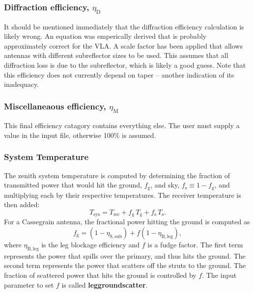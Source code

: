 \documentclass{article}
\begin{document}
\subsubsection{Diffraction efficiency, $\eta_\mathrm{D}$}

It should be mentioned immediately that the diffraction efficiency 
calculation is likely wrong.  An equation was emperically derived that 
is probably approximately correct for the VLA.  A scale factor
has been applied that allows antennas with different subreflector
sizes to be used.  This assumes that all diffraction loss is due to the
subreflector, which is likely a good guess.  Note that this efficiency
does not currently depend on taper -- another indication of its inadequacy.

\subsubsection{Miscellaneaous efficiency, $\eta_\mathrm{M}$}

This final efficiency catagory contains everything else.  The user must supply
a value in the input file, otherwise 100\% is assumed.

\subsubsection{System Temperature}

The zenith system temperature is computed by determining the fraction of
transmitted power that would hit the ground, $f_\mathrm{g}$, and sky,
$f_\mathrm{s} \equiv 1-f_\mathrm{g}$, and multiplying each by their
respective temperatures.  The receiver temperature is then added:
\begin{equation} \label{eqn:tsys}
T_\mathrm{sys} = T_\mathrm{rec} + f_\mathrm{g}\,T_\mathrm{g} +
f_\mathrm{s}\,T_\mathrm{s}.
\end{equation}
For a Cassegrain antenna, the fractional power hitting the ground 
is computed as
\begin{equation}
f_\mathrm{g} = (1 - \eta_\mathrm{S,sub}) + f (1 - \eta_\mathrm{B,leg}),
\end{equation}
where $\eta_\mathrm{B,leg}$ is the leg blockage efficiency and $f$ is
a fudge factor.  The first term represents the power that spills over the
primary, and thus hits the ground.  The second term represents the power that
scatters off the struts to the ground.  The fraction of scattered power that
hits the ground is controlled by $f$.  The input parameter to set $f$ is
called {\bf leggroundscatter}.
\end{document}
